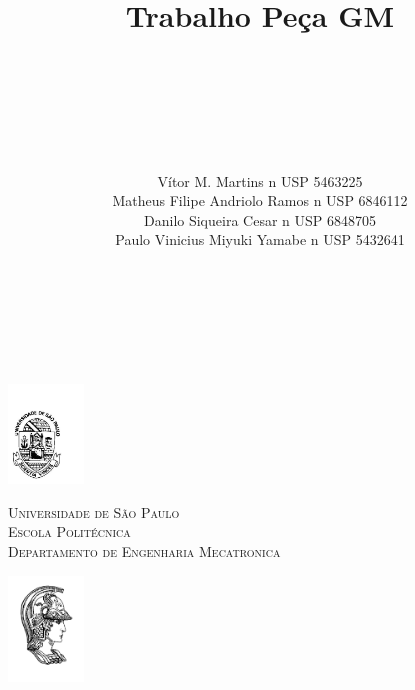 \documentclass[a4paper, 12pt]{article}
\author{\\ \\ \\ \\ \\ \\ Vítor M. Martins n USP 5463225\\
Matheus Filipe Andriolo Ramos n USP 6846112 \\ 
Danilo Siqueira Cesar n USP 6848705 \\  
Paulo Vinicius Miyuki Yamabe n USP 5432641 \\ \\ \\ \\ \\}
\title{Trabalho Peça GM}
\begin{document}
\begin{minipage}[b]{.1\linewidth} %
\centering
\includegraphics[width=2cm]{./fig/Logo_usp_jpg.pdf}
\end{minipage}
\hspace{1.1cm}
\begin{minipage}[b]{.5\textwidth}
\begin{center}
\normalsize{\textsc{Universidade de São Paulo}}\\
\small{\textsc{Escola Politécnica}}\\
\footnotesize{\textsc{Departamento de Engenharia Mecatronica}}\\[0.5cm]
\end{center}
\end{minipage}
\hspace{0.9cm} %
\begin{minipage}[b]{0.1\linewidth}
\includegraphics[width=2cm]{./fig/minerva.pdf}
\end{minipage}
\end{document}
